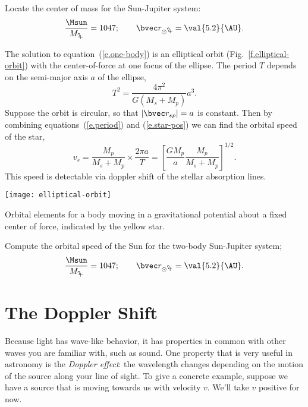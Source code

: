 \begin{exercisebox}
Locate the center of mass for the Sun-Jupiter system:
\[ \frac{\Msun}{M_{\mathrm{\jupiter}}} = 1047; \qquad \rv_{\mathrm{\odot\jupiter}} = \val{5.2}{\AU}. \]
\end{exercisebox}

The solution to equation~(\ref{e.one-body}) is an elliptical orbit (Fig.~\ref{f.elliptical-orbit}) with the center-of-force at one focus of the ellipse.  The period $T$ depends on the semi-major axis $a$ of the ellipse,
\begin{equation}\label{e.period}
	T^{2} = \frac{4\pi^{2}}{G(M_{s}+M_{p})} a^{3}.
\end{equation}
Suppose the orbit is circular, so that $|\rv_{sp}|=a$ is constant.  Then by combining equations~(\ref{e.period}) and (\ref{e.star-pos}) we can find the orbital speed of the star,
\begin{equation}\label{e.star-velocity}
	v_{s} = \frac{M_{p}}{M_{s}+M_{p}} \times \frac{2\pi a}{T} = \left[\frac{GM_{p}}{a}
	\frac{M_{p}}{M_{s}+M_{p}}\right]^{1/2}.
\end{equation}
This speed is detectable via doppler shift of the stellar absorption lines.

\begin{marginfigure}
\texttt{[image: elliptical-orbit]}
\caption[Orbital elements]{Orbital elements for a body moving in a gravitational potential about a fixed center of force, indicated by the yellow star.}
\label{f.elliptical-orbit}
\end{marginfigure}

\begin{exercisebox}
\label{ex.sun-orbital-speed}
	Compute the orbital speed of the Sun for the two-body Sun-Jupiter system;
\[ \frac{\Msun}{M_{\mathrm{\jupiter}}} = 1047; \qquad \rv_{\mathrm{\odot\jupiter}} = \val{5.2}{\AU}. \]
\end{exercisebox}

\section{The Doppler Shift}\label{s.doppler}

Because light has wave-like behavior, it has properties in common with other waves you are familiar with, such as sound.  One property that is very useful in astronomy is the \emph{Doppler effect}: the wavelength changes depending on the motion of the source along your line of sight.  To give a concrete example, suppose we have a source that is moving towards us with velocity $v$.  We'll take $v$ positive for now.

